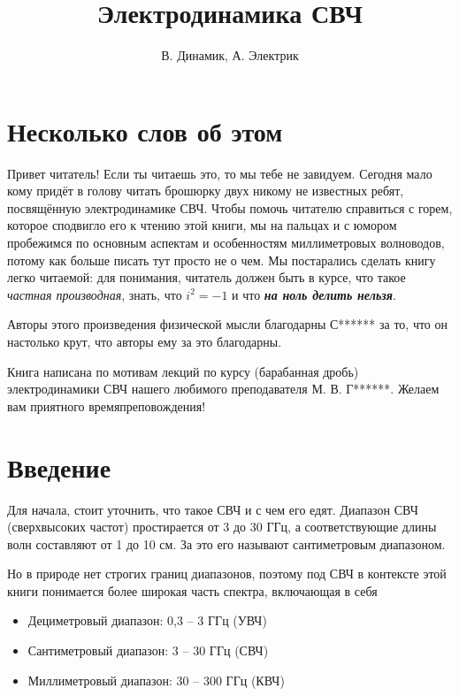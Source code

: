 \documentclass[a4paper, oneside, 12pt]{book}
\begin{document}
\title{Электродинамика СВЧ}
\author{В. Динамик, А. Электрик}
\maketitle
\tableofcontents
\chapter*{Несколько слов об этом}
    Привет читатель! Если ты читаешь это, то мы тебе не завидуем. Сегодня мало
    кому придёт в голову читать брошюрку двух никому не известных ребят,
    посвящённую электродинамике СВЧ. Чтобы помочь читателю справиться с горем,
    которое сподвигло его к чтению этой книги, мы на пальцах и с юмором
    пробежимся по основным аспектам и особенностям миллиметровых волноводов,
    потому как больше писать тут просто не о чем. Мы постарались сделать книгу
    легко читаемой: для понимания, читатель должен быть в курсе, что такое
    \emph{частная производная}, знать, что \( i^2 = -1 \) и что
    \emph{\bfseries на ноль делить нельзя}.

    Авторы этого произведения физической мысли благодарны С****** за то, что он
    настолько крут, что авторы ему за это благодарны.

    Книга написана по мотивам лекций по курсу (барабанная дробь) электродинамики
    СВЧ нашего любимого преподавателя М. В. Г******. Желаем вам приятного
    времяпреповождения!

\chapter*{Введение}
Для начала, стоит уточнить, что такое СВЧ и с чем его едят. Диапазон СВЧ
(сверхвысоких частот) простирается от 3 до 30 ГГц, а соответствующие длины волн
составляют от 1 до 10 см. За это его называют сантиметровым диапазоном.

Но в природе нет строгих границ диапазонов, поэтому под СВЧ в контексте этой
книги понимается более широкая часть спектра, включающая в себя
  \begin{itemize}
    \item Дециметровый диапазон: 0,3 -- 3 ГГц (УВЧ)
    \item Сантиметровый диапазон: 3 -- 30 ГГц (СВЧ)
    \item Миллиметровый диапазон: 30 -- 300 ГГц (КВЧ)
  \end{itemize}
\end{document}
